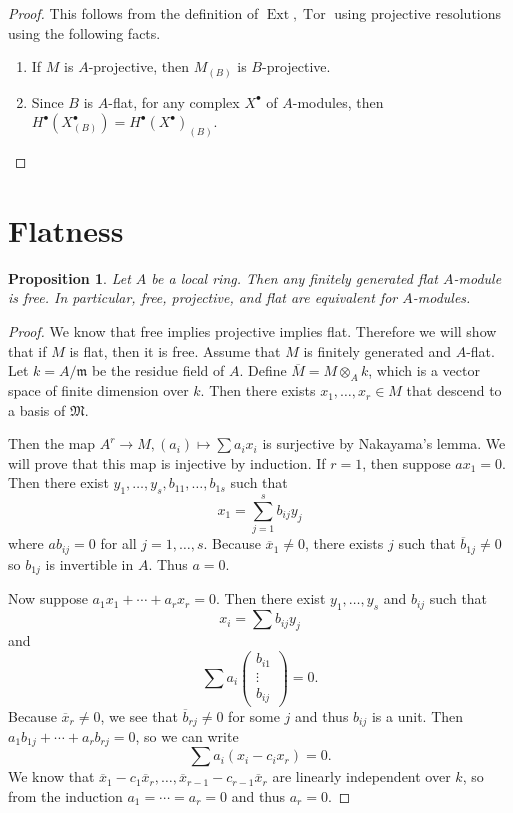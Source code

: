 \documentclass[leqno, openany]{memoir}
\newtheorem{prop}[thm]{Proposition}
\theoremstyle{definition}
\theoremstyle{remark}
\theoremstyle{plain}
\theoremstyle{definition}
\theoremstyle{remark}
\newcommand{\mf}[1]{\mathfrak{#1}}
\newcommand{\ol}[1]{\overline{#1}}
\DeclareMathOperator{\Ext}{Ext}
\DeclareMathOperator{\Tor}{Tor}
\begin{document}
\begin{proof} This follows from the definition of $\Ext, \Tor$ using projective
    resolutions using the following facts.  \begin{enumerate} \item If $M$ is
        $A$-projective, then $M_{(B)}$ is $B$-projective.  \item Since $B$ is
        $A$-flat, for any complex $X^{\bullet}$ of $A$-modules, then
        $H^{\bullet}(X_{(B)}^{\bullet}) = H^{\bullet}(X^{\bullet})_{(B)}$.
\end{enumerate} \end{proof}

\section{Flatness}%

\begin{prop} Let $A$ be a local ring. Then any finitely generated flat
$A$-module is free. In particular, free, projective, and flat are equivalent
for $A$-modules.  \end{prop}

\begin{proof} We know that free implies projective implies flat. Therefore we
    will show that if $M$ is flat, then it is free. Assume that $M$ is finitely
    generated and $A$-flat. Let $k = A / \mf{m}$ be the residue field of $A$.
    Define $\ol{M} = M \otimes_A k$, which is a vector space of finite
    dimension over $k$. Then there exists $x_1, \ldots, x_r \in M$ that descend
    to a basis of $\mf{M}$.

    Then the map $A^r \to M, (a_i) \mapsto \sum a_i x_i$ is surjective by
    Nakayama's lemma. We will prove that this map is injective by induction. If
    $r = 1$, then suppose $a x_1 = 0$. Then there exist $y_1, \ldots, y_s,
    b_{11}, \ldots, b_{1s}$ such that \[ x_1 = \sum_{j=1}^s b_{ij} y_j \] where
    $ab_{ij} = 0$ for all $j = 1, \ldots, s$. Because $\ol{x}_1 \neq 0$, there
    exists $j$ such that $\ol{b}_{1j} \neq 0$ so $b_{1j}$ is invertible in $A$.
    Thus $a = 0$.

    Now suppose $a_1 x_1 + \cdots + a_r x_r = 0$. Then there exist $y_1,
    \ldots, y_s$ and $b_{ij}$ such that \[ x_i = \sum b_{ij} y_j \] and \[ \sum
    a_i \begin{pmatrix} b_{i1} \\ \vdots \\ b_{ij} \end{pmatrix} = 0. \]
    Because $\ol{x}_r \neq 0$, we see that $\ol{b}_{rj} \neq 0$ for some $j$
    and thus $b_{ij}$ is a unit. Then $a_1 b_{1j} + \cdots + a_r b_{rj} = 0$,
    so we can write \[ \sum a_i (x_i - c_i x_r) = 0. \] We know that $\ol{x}_1
- c_1 \ol{x}_r, \ldots, \ol{x}_{r-1} - c_{r-1} \ol{x}_r$ are linearly
independent over $k$, so from the induction $a_1 = \cdots = a_r = 0$ and thus
$a_r = 0$.  \end{proof}
\end{document}
